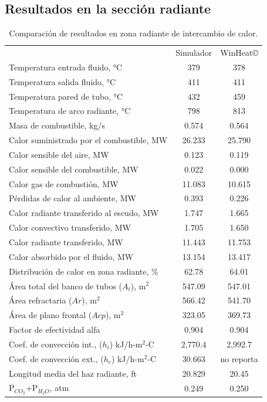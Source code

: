 \subsection{Resultados en la sección radiante}
\begin{table}[H] \begin{center}
\caption[Resultados en zona radiante de intercambio de calor]{Comparación de resultados en zona radiante de intercambio de calor.}
\label{tbl:compara-zr} \begin{tabular}{l|c|c}
	& Simulador & WinHeat\copyright \\
Temperatura entrada fluido, °C	& 379 & 378	\\
Temperatura salida fluido, °C	& 411 & 411	\\
Temperatura pared de tubo, °C	& 432 & 459	\\
Temperatura de arco radiante, °C& 798 & 813	\\

Masa de combustible, kg/s		& 0.574 & 0.564	\\
Calor suministrado por el combustible, MW	& 26.233 & 25.790	\\
Calor sensible del aire, MW					& 0.123 & 0.119	\\
Calor sensible del combustible, MW			& 0.022 & 0.000	\\

Calor gas de combustión, MW		& 11.083 & 10.615	\\
Pérdidas de calor al ambiente, MW	& 0.393 & 0.226	\\
Calor radiante transferido al escudo, MW	& 1.747 & 1.665	\\
Calor convectivo transferido, MW	& 1.705 & 1.650	\\
Calor radiante transferido, MW		& 11.443 & 11.753	\\
Calor absorbido por el fluido, MW	& 13.154 & 13.417	\\

Distribución de calor en zona radiante, \%	& 62.78 & 64.01 \\

Área total del banco de tubos ($A_t$), m$^2$& 547.09 & 547.01 \\
Área refractaria ($Ar$), m$^2$		& 566.42 & 541.70 \\
Área de plano frontal ($Acp$), m$^2$	& 323.05 & 369.73 \\
Factor de efectividad alfa			& 0.904 & 0.904 \\

Coef. de convección int., ($h_i$) kJ/h-m$^2$-C	& 2,770.4 & 2,992.7 \\
Coef. de convección ext., ($h_c$) kJ/h-m$^2$-C	& 30.663 & no reporta \\

Longitud media del haz radiante, ft	& 20.829 & 20.45 \\
P$_{CO_2}$+P$_{H_2O}$, atm 		    & 0.249 & 0.250 \\
\end{tabular} \end{center} \end{table}
